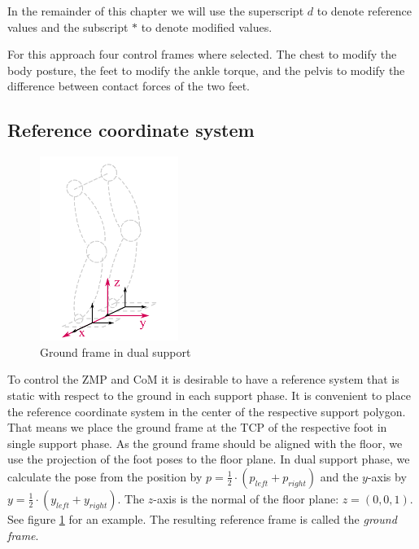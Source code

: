 \documentclass[english,ngerman]{KITreprt}
\begin{document}
In the remainder of this chapter we will use the superscript $d$ to
denote reference values and the subscript $*$ to denote modified values.

For this approach four control frames where selected. The chest to
modify the body posture, the feet to modify the ankle torque, and the
pelvis to modify the difference between contact forces of the two feet.

\subsection{Reference coordinate
system}\label{reference-coordinate-system}

\begin{figure}
\vspace*{-1em}
\includegraphics[width=0.4\textwidth]{images/ground_frame.png}
\caption{Ground frame in dual support}
\label{img:ground-frame}
\end{figure}

To control the ZMP and CoM it is desirable to have a reference system
that is static with respect to the ground in each support phase. It is
convenient to place the reference coordinate system in the center of the
respective support polygon. That means we place the ground frame at the
TCP of the respective foot in single support phase. As the ground frame
should be aligned with the floor, we use the projection of the foot
poses to the floor plane. In dual support phase, we calculate the pose
from the position by $p = \frac{1}{2} \cdot (p_{left} + p_{right})$ and
the $y$-axis by $y = \frac{1}{2} \cdot (y_{left} + y_{right})$. The
$z$-axis is the normal of the floor plane: $z = (0, 0, 1)$. See figure
\ref{img:ground-frame} for an example. The resulting reference frame is
called the \emph{ground frame}.
\end{document}
